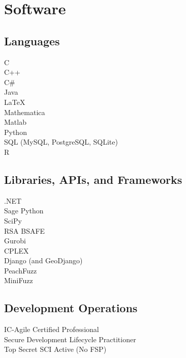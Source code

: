 \documentclass[letterpaper]{deedy-resume} %
\begin{document}
\begin{minipage}[t]{0.33\textwidth}
\sectionspace %


\section{Software}

\subsection{Languages}

C\\
C++\\
C\#\\
Java\\
\LaTeX\\
Mathematica\\
Matlab\\
Python\\
SQL (MySQL, PostgreSQL, SQLite)\\
R\\


\sectionspace %


\subsection{Libraries, APIs, and Frameworks}

.NET\\
Sage Python\\
SciPy\\
RSA BSAFE\\
Gurobi\\
CPLEX\\
Django (and GeoDjango)\\
PeachFuzz\\
MiniFuzz\\
\subsection{Development Operations}

IC-Agile Certified Professional\\
Secure Development Lifecycle Practitioner\\
Top Secret SCI Active (No FSP)\\


\end{minipage}
\end{document}

